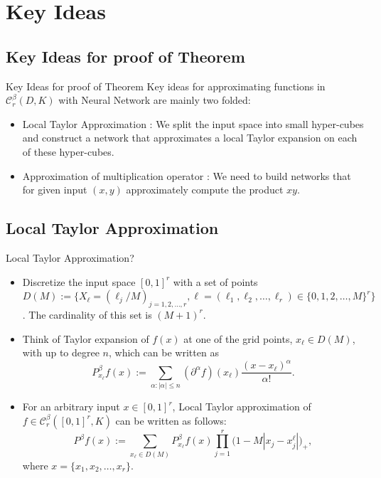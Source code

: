 \documentclass{if-beamer}
\begin{document}
\section{Key Ideas}
\subsection{Key Ideas for proof of Theorem}
\begin{frame}{Key Ideas for proof of Theorem}
    Key ideas for approximating functions in $\mathcal{C}_{r}^{\beta}(D,K)$ with Neural Network are mainly two folded:
    \begin{itemize}
        \item Local Taylor Approximation : We split the input space into small hyper-cubes and construct a network that approximates a local Taylor expansion on each of these hyper-cubes.
        \item Approximation of multiplication operator : We need to build networks that for given input $(x,y)$ approximately compute the product $xy$. 
    \end{itemize}
\end{frame}

\subsection{Local Taylor Approximation}
\begin{frame}{Local Taylor Approximation?}
    \begin{itemize}
      \item Discretize the input space $[0,1]^{r}$ with a set of points     $D(M):=\{X_{\ell}=(\ell_{j}/M)_{j=1,2,\dots,r},\ell=(\ell_{1},\ell_{2},\dots,\ell_{r}) \in\{0,1,2,\dots,M\}^{r}\}$. The cardinality of this set is $(M+1)^{r}$.
      \item Think of Taylor expansion of $f(x)$ at one of the grid points, $x_{\ell}\in D(M)$, with up to degree $n$, which can be written as 
    \begin{equation*}
        P_{x_{\ell}}^{\beta}f(x):=\sum_{\alpha:|\alpha|\leq n}(\partial^{\alpha}f)(x_{\ell})\frac{(x-x_{\ell})^{\alpha}}{\alpha!}.
    \end{equation*}
      \item For an arbitrary input $x\in[0,1]^{r}$, Local Taylor approximation of $f\in \mathcal{C}_{r}^{\beta}([0,1]^{r},K)$ can be written as follows:
    \begin{equation*}
        P^{\beta}f(x):=\sum_{x_{\ell}\in D(M)}P_{x_{\ell}}^{\beta}f(x)\prod_{j=1}^{r}\bigg( 1- M|x_{j}-x_{j}^{\ell}| \bigg)_{+},
    \end{equation*}
    where $x=\{x_{1},x_{2},\dots,x_{r}\}$.
    \end{itemize}
\end{frame}
\end{document}
